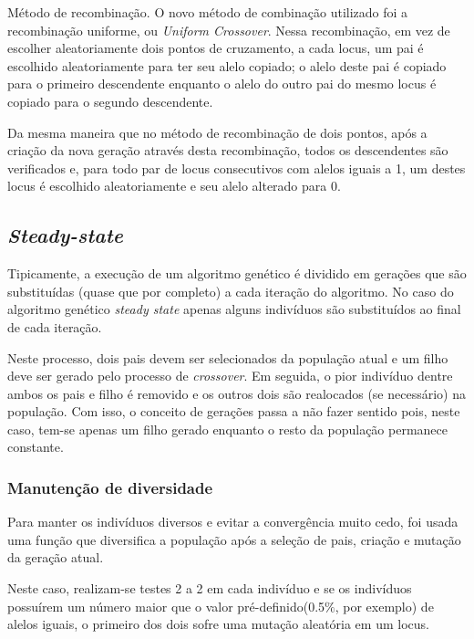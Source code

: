 \documentclass[12pt,a4paper]{article}
\begin{document}
        Método de recombinação. O novo método de combinação utilizado foi a recombinação uniforme, ou \textit{Uniform Crossover}. Nessa recombinação, em vez de escolher aleatoriamente dois
        pontos de cruzamento, a cada locus, um pai é escolhido aleatoriamente para ter seu alelo copiado; o alelo deste pai é copiado para o primeiro descendente enquanto o alelo do outro
        pai do mesmo locus é copiado para o segundo descendente.

        Da mesma maneira que no método de recombinação de dois pontos, após a criação da nova geração através desta recombinação, todos os descendentes são verificados e, para todo par de locus
        consecutivos com alelos iguais a 1, um destes locus é escolhido aleatoriamente e seu alelo alterado para 0.


    \subsection{\emph{Steady-state}}

        Tipicamente, a execução de um algoritmo genético é dividido em gerações que são substituídas (quase que por completo) a cada iteração do algoritmo. No caso do algoritmo genético \emph{steady
        state} apenas alguns indivíduos são substituídos ao final de cada iteração.

        Neste processo, dois pais devem ser selecionados da população atual e um filho deve ser gerado pelo processo de \emph{crossover}. Em seguida, o pior indivíduo dentre ambos os pais e filho é
        removido e os outros dois são realocados (se necessário) na população. Com isso, o conceito de gerações passa a não fazer sentido pois, neste caso, tem-se apenas um filho gerado enquanto o
        resto da população permanece constante.  

    \subsubsection{Manutenção de diversidade}

        Para manter os indivíduos diversos e evitar a convergência muito cedo, foi usada uma função que diversifica a população após a seleção de pais, criação e mutação da geração atual.

        Neste caso, realizam-se testes 2 a 2 em cada indivíduo e se os indivíduos possuírem um número maior que o valor pré-definido(0.5$\%$, por exemplo) de alelos iguais, o primeiro dos
        dois sofre uma mutação aleatória em um locus.
\end{document}
